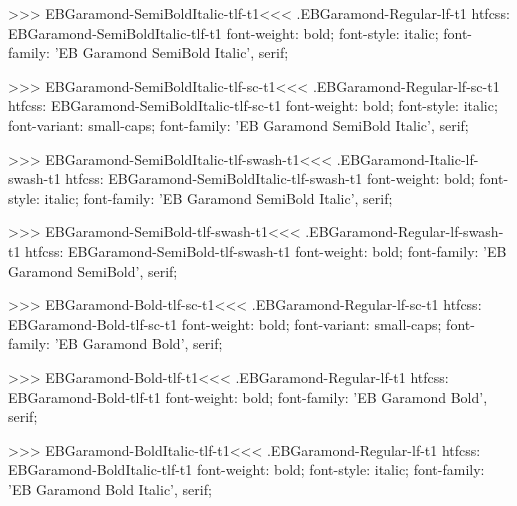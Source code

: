 {{{{{{{>>>
\<EBGaramond-SemiBoldItalic-tlf-t1\><<<
.EBGaramond-Regular-lf-t1
htfcss:  EBGaramond-SemiBoldItalic-tlf-t1  font-weight: bold; font-style: italic; font-family: 'EB Garamond SemiBold Italic', serif;

>>>
\<EBGaramond-SemiBoldItalic-tlf-sc-t1\><<<
.EBGaramond-Regular-lf-sc-t1
htfcss:  EBGaramond-SemiBoldItalic-tlf-sc-t1  font-weight: bold; font-style: italic; font-variant: small-caps; font-family: 'EB Garamond SemiBold Italic', serif;

>>>
\<EBGaramond-SemiBoldItalic-tlf-swash-t1\><<<
.EBGaramond-Italic-lf-swash-t1
htfcss:  EBGaramond-SemiBoldItalic-tlf-swash-t1  font-weight: bold; font-style: italic; font-family: 'EB Garamond SemiBold Italic', serif;

>>>
\<EBGaramond-SemiBold-tlf-swash-t1\><<<
.EBGaramond-Regular-lf-swash-t1
htfcss:  EBGaramond-SemiBold-tlf-swash-t1  font-weight: bold; font-family: 'EB Garamond SemiBold', serif;

>>>
\<EBGaramond-Bold-tlf-sc-t1\><<<
.EBGaramond-Regular-lf-sc-t1
htfcss:  EBGaramond-Bold-tlf-sc-t1  font-weight: bold; font-variant: small-caps; font-family: 'EB Garamond Bold', serif;

>>>
\<EBGaramond-Bold-tlf-t1\><<<
.EBGaramond-Regular-lf-t1
htfcss:  EBGaramond-Bold-tlf-t1  font-weight: bold; font-family: 'EB Garamond Bold', serif;

>>>
\<EBGaramond-BoldItalic-tlf-t1\><<<
.EBGaramond-Regular-lf-t1
htfcss:  EBGaramond-BoldItalic-tlf-t1  font-weight: bold; font-style: italic; font-family: 'EB Garamond Bold Italic', serif;

}}}}}}}
